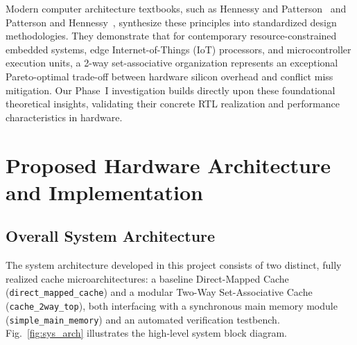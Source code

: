 \documentclass[conference]{IEEEtran}
\begin{document}
Modern computer architecture textbooks, such as Hennessy and Patterson~\cite{hennessy2017computer} and Patterson and Hennessy~\cite{patterson2020riscv}, synthesize these principles into standardized design methodologies. They demonstrate that for contemporary resource-constrained embedded systems, edge Internet-of-Things (IoT) processors, and microcontroller execution units, a 2-way set-associative organization represents an exceptional Pareto-optimal trade-off between hardware silicon overhead and conflict miss mitigation. Our Phase~I investigation builds directly upon these foundational theoretical insights, validating their concrete RTL realization and performance characteristics in hardware.

\section{Proposed Hardware Architecture and Implementation}
\label{sec:architecture}

\subsection{Overall System Architecture}
The system architecture developed in this project consists of two distinct, fully realized cache microarchitectures: a baseline Direct-Mapped Cache (\texttt{direct\_mapped\_cache}) and a modular Two-Way Set-Associative Cache (\texttt{cache\_2way\_top}), both interfacing with a synchronous main memory module (\texttt{simple\_main\_memory}) and an automated verification testbench. Fig.~\ref{fig:sys_arch} illustrates the high-level system block diagram.
\end{document}
